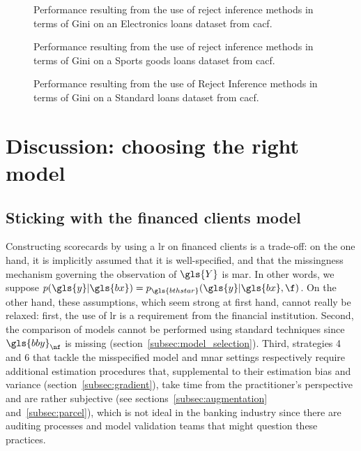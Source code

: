 \begin{figure}[!ht]
\centering \resizebox{.8\textwidth}{!}{}
\caption{Performance resulting from the use of reject inference methods in terms of Gini on an Electronics loans dataset from \gls{cacf}.}
\label{fig:darty_reject}
\end{figure}

\begin{figure}[!ht]
\centering \resizebox{.8\textwidth}{!}{}
\caption{Performance resulting from the use of reject inference methods in terms of Gini on a Sports goods loans dataset from \gls{cacf}.}
\label{fig:decathlon_reject}
\end{figure}

\begin{figure}[!ht]
\centering \resizebox{.8\textwidth}{!}{}
\caption{Performance resulting from the use of Reject Inference methods in terms of Gini on a Standard loans dataset from \gls{cacf}.}
\label{fig:M3_reject}
\end{figure}

\section{Discussion: choosing the right model} \label{sec:conclusion_reject}

\subsection{Sticking with the financed clients model}

Constructing scorecards by using a \gls{lr} on financed clients is a trade-off: on the one hand, it is implicitly assumed that it is well-specified, and that the missingness mechanism governing the observation of $\gls{Y}$ is \gls{mar}. In other words, we suppose $p(\gls{y} | \gls{bx}) = p_{\gls{bthstar}}(\gls{y} | \gls{bx}, \f)$. On the other hand, these assumptions, which seem strong at first hand, cannot really be relaxed: first, the use of \gls{lr} is a requirement from the financial institution.
Second, the comparison of models cannot be performed using standard techniques since $\gls{bby}_{\nf}$ is missing (section~\ref{subsec:model_selection}). Third, strategies 4 and 6 that tackle the misspecified model and \gls{mnar} settings respectively require additional estimation procedures that, supplemental to their estimation bias and variance (section~\ref{subsec:gradient}), take time from the practitioner's perspective and are rather subjective (see sections~\ref{subsec:augmentation} and~\ref{subsec:parcel}), which is not ideal in the banking industry since there are auditing processes and model validation teams that might question these practices.

